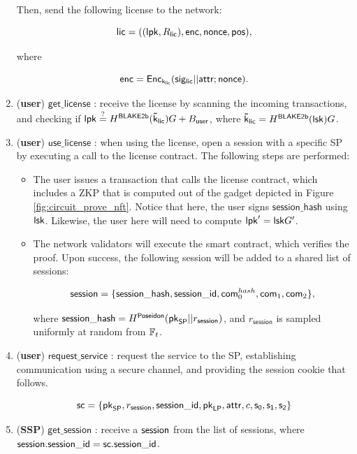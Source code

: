 \begin{enumerate}
	Then, send the following license to the network:

		$$\mathsf{lic} = ((\mathsf{lpk}, R_{\mathsf{lic}}), \mathsf{enc}, \mathsf{nonce}, \mathsf{pos}),$$

	where 

		$$\mathsf{enc} = \mathsf{Enc}_{\mathsf{k_{lic}}} (\mathsf{sig_{lic}} || \mathsf{attr}; \mathsf{nonce}).$$

	\item (\textbf{user}) $\mathsf{get\_license}$ : receive the license by scanning the incoming transactions, and checking if $\mathsf{lpk} \stackrel{?}{=} H^\mathsf{BLAKE2b}(\mathsf{\tilde{k}_{lic}}) G + B_{\mathsf{user}}$, where $\mathsf{\tilde{k}_{lic}} = H^\mathsf{BLAKE2b}(\mathsf{lsk})G$.

	\item (\textbf{user}) $\mathsf{use\_license}$ : when using the license, open a session with a specific SP by executing a call to the license contract. The following steps are performed:

	\begin{itemize}
		\item The user issues a transaction that calls the license contract, which includes a ZKP that is computed out of the gadget depicted in Figure \ref{fig:circuit_prove_nft}. Notice that here, the user signs $\mathsf{session\_hash}$ using $\mathsf{lsk}$. Likewise, the user here will need to compute $\mathsf{lpk}' = \mathsf{lsk} G'$.
		\item The network validators will execute the smart contract, which verifies the proof. Upon success, the following session will be added to a shared list of sessions:

			$$\mathsf{session} = \{\mathsf{session\_hash}, \mathsf{session\_id}, \mathsf{com}_0^{hash}, \mathsf{com}_1, \mathsf{com}_2\},$$

		where $\mathsf{session\_hash} = H^\mathsf{Poseidon}(\mathsf{pk}_{\mathsf{SP}} || r_\mathsf{session})$, and $r_\mathsf{session}$ is sampled uniformly at random from $\mathbb{F}_t$.


	\end{itemize}

	\item (\textbf{user}) $\mathsf{request\_service}$ : request the service to the SP, establishing communication using a secure channel, and providing the session cookie that follows.

		$$\mathsf{sc} = \{\mathsf{pk}_{\mathsf{SP}}, r_\mathsf{session}, \mathsf{session\_id}, \mathsf{pk}_{\mathsf{LP}}, \mathsf{attr}, c, \mathsf{s_0}, \mathsf{s_1}, \mathsf{s_2}\}$$

	\item (\textbf{SSP}) $\mathsf{get\_session}$ : receive a $\mathsf{session}$ from the list of sessions, where $\mathsf{session}.\mathsf{session\_id} = \mathsf{sc}.\mathsf{session\_id}$.


\end{enumerate}
